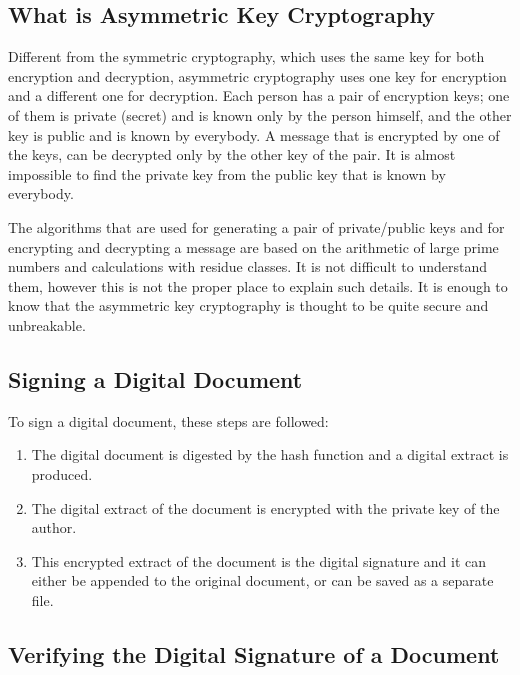 \documentclass[a4paper]{article}
\begin{document}
\subsection{What is Asymmetric Key Cryptography}

Different from the symmetric cryptography, which uses the same key for
both encryption and decryption, asymmetric cryptography uses one key
for encryption and a different one for decryption.  Each person has a
pair of encryption keys; one of them is private (secret) and is known
only by the person himself, and the other key is public and is known
by everybody. A message that is encrypted by one of the keys, can be
decrypted only by the other key of the pair. It is almost impossible
to find the private key from the public key that is known by
everybody.

The algorithms that are used for generating a pair of private/public
keys and for encrypting and decrypting a message are based on the
arithmetic of large prime numbers and calculations with residue
classes. It is not difficult to understand them, however this is not
the proper place to explain such details. It is enough to know that
the asymmetric key cryptography is thought to be quite secure and
unbreakable.

\subsection{Signing a Digital Document}

To sign a digital document, these steps are followed:
\begin{enumerate}
  \item The digital document is digested by the hash function and a
    digital extract is produced.
  \item The digital extract of the document is encrypted with the
    private key of the author.
  \item This encrypted extract of the document is the digital
    signature and it can either be appended to the original document,
    or can be saved as a separate file.
\end{enumerate}

\subsection{Verifying the Digital Signature of a Document}
\end{document}
